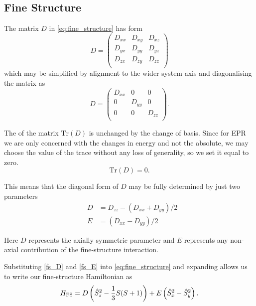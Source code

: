\subsection{Fine Structure}
The matrix $D$ in \eqref{eq:fine_structure} has form 
\begin{equation}
   D = \begin{pmatrix}
       D_{xx} & D_{xy} & D_{xz} \\ 
       D_{yx} & D_{yy} & D_{yz} \\ 
       D_{zx} & D_{zy} & D_{zz} \\ 
   \end{pmatrix} 
\end{equation}
which may be simplified by alignment to the wider system axis and diagonalising the matrix as 
\begin{equation}
   D = \begin{pmatrix}
       D_{xx} & 0 & 0 \\ 
       0 & D_{yy} & 0 \\ 
       0 & 0 & D_{zz} \\ 
   \end{pmatrix}.
    \label{eq:fine_splitting_D}
\end{equation}

The  of the matrix $\text{Tr}(D)$ is unchanged by the change of basis. Since for EPR we are only concerned with the changes in energy and not the absolute, we may choose the value of the trace without any loss of generality, so we set it equal to zero. 
\begin{equation}
    \text{Tr}(D) = 0. 
\end{equation}

This means that the diagonal form of $D$ may be fully determined by just two parameters 
\begin{eqnarray}
    &D &= D_{zz} - (D_{xx}+ D_{yy})/2 \label{fs_D}\\ 
    &E &= (D_{xx} - D_{yy})/2 \label{fs_E}
\end{eqnarray}

Here $D$ represents the axially symmetric parameter and $E$ represents any non-axial contribution of the fine-structure interaction. 

Substituting \eqref{fs_D} and \eqref{fs_E} into \eqref{eq:fine_structure} and expanding allows us to write our fine-structure Hamiltonian as
\begin{equation}
    H_{\ce{FS}} = D \left(\hat{S}_z^2 - \frac{1}{3}S(S+1)\right) + E\left(\hat{S}_x^2 - \hat{S}_y^2\right).
    \label{eq:fine_structure_hamiltonian}
\end{equation}

